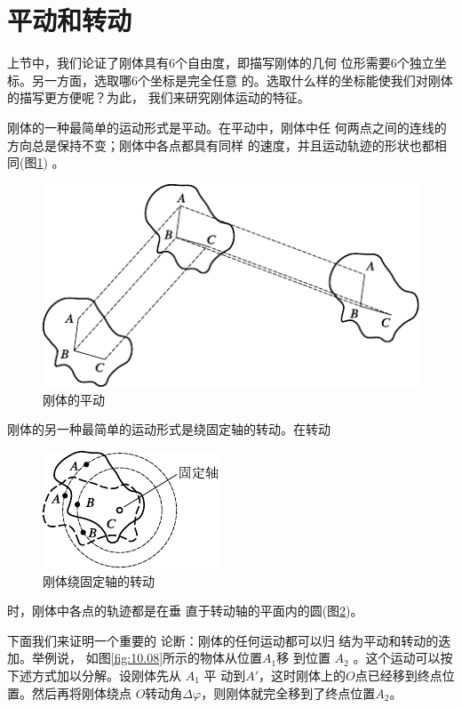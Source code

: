 \section{平动和转动}\label{sec:10.02}

上节中，我们论证了刚体具有$ 6 $个自由度，即描写刚体的几何
位形需要$ 6 $个独立坐标。另一方面，选取哪$ 6 $个坐标是完全任意
的。选取什么样的坐标能使我们对刚体的描写更方便呢？为此，
我们来研究刚体运动的特征。

刚体的一种最简单的运动形式是平动。在平动中，刚体中任
\clearpage\noindent
何两点之间的连线的方向总是保持不变；刚体中各点都具有同样
的速度，并且运动轨迹的形状也都相同(图\ref{fig:10.06}) 。

\begin{figure}[h]
  \centering
  \includegraphics{figure/fig10.06}
  \caption{刚体的平动}
  \label{fig:10.06}
\end{figure}

刚体的另一种最简单的运动形式是绕固定轴的转动。在转动
\begin{figure}
  \centering
  \includegraphics{figure/fig10.07}
  \caption{刚体绕固定轴的转动}
  \label{fig:10.07}
\end{figure}
时，刚体中各点的轨迹都是在垂
直于转动轴的平面内的圆(图\ref{fig:10.07})。

下面我们来证明一个重要的
论断：刚体的任何运动都可以归
结为平动和转动的迭加。举例说，
如图\ref{fig:10.08}所示的物体从位置$ A _ { 1 } $移
到位置 $ A _ { 2 } $ 。这个运动可以按下述方式加以分解。设刚体先从 $ A _ { 1 } $ 平
动到$ A' $，这时刚体上的$ O $点已经移到终点位置。然后再将刚体绕点
$ O $转动角$ \Delta \varphi $，则刚体就完全移到了终点位置$ A_2 $。

